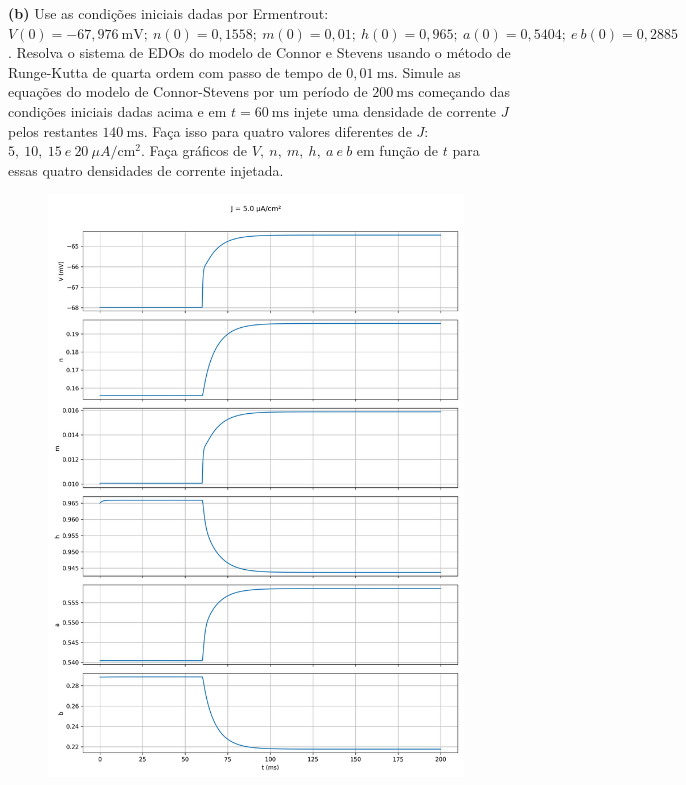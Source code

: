 \documentclass[english,11pt,a4paper]{article}
\begin{document}
	
	\noindent \textbf{(b)} Use as condições iniciais dadas por Ermentrout: $V(0) = -67{,}976 \ \text{mV}; \ n(0) = 0{,}1558; \ m(0) = 0{,}01; \ h(0) = 0{,}965; \ a(0) = 0{,}5404; \ e \ b(0) = 0{,}2885$. Resolva o sistema de EDOs do modelo de Connor e Stevens usando o método de Runge-Kutta de quarta ordem com passo de tempo de $0{,}01 \ \text{ms}$. Simule as equações do modelo de Connor-Stevens por um período de $200 \ \text{ms}$ começando das condições iniciais dadas acima e em $t = 60 \ \text{ms}$ injete uma densidade de corrente $J$ pelos restantes $140 \ \text{ms}$. Faça isso para quatro valores diferentes de $J$: $5, \ 10, \ 15 \ e \ 20 \ \mu A/\text{cm}^2$. Faça gráficos de $V, \ n, \ m, \ h, \ a \ e \ b$ em função de $t$ para essas quatro densidades de corrente injetada.\\
	
	\begin{figure}[H]
	\centering
	\includegraphics[width=11cm]{../figures/ex_1b_1.png}	
	\end{figure}
\end{document}
